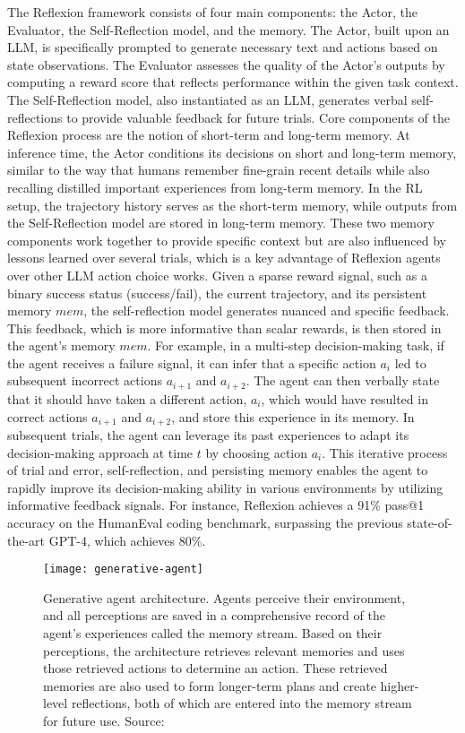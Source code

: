 The Reflexion framework consists of four main components: the Actor, the Evaluator, the Self-Reflection model, and the memory.
The Actor, built upon an LLM, is specifically prompted to generate necessary text and actions based on state observations.
The Evaluator assesses the quality of the Actor's outputs by computing a reward score that reflects performance within the given task context.
The Self-Reflection model, also instantiated as an LLM, generates verbal self-reflections to provide valuable feedback for future trials.
Core components of the Reflexion process are the notion of short-term and long-term memory.
At inference time, the Actor conditions its decisions on short and long-term memory, similar to the way that humans remember fine-grain recent details while also recalling distilled important experiences from long-term memory.
In the RL setup, the trajectory history serves as the short-term memory, while outputs from the Self-Reflection model are stored in long-term memory.
These two memory components work together to provide specific context but are also influenced by lessons learned over several trials, which is a key advantage of Reflexion agents over other LLM action choice works.
Given a sparse reward signal, such as a binary success status (success/fail), the current trajectory, and its persistent memory \(mem\), the self-reflection model generates nuanced and specific feedback.
This feedback, which is more informative than scalar rewards, is then stored in the agent’s memory \(mem\).
For example, in a multi-step decision-making task, if the agent receives a failure signal, it can infer that a specific action \(a_i\) led to subsequent incorrect actions \(a_{i+1}\) and \(a_{i+2}\).
The agent can then verbally state that it should have taken a different action, \(a_i\), which would have resulted in correct actions \(a_{i+1}\) and \(a_{i+2}\), and store this experience in its memory.
In subsequent trials, the agent can leverage its past experiences to adapt its decision-making approach at time \(t\) by choosing action \(a_i\).
This iterative process of trial and error, self-reflection, and persisting memory enables the agent to rapidly improve its decision-making ability in various environments by utilizing informative feedback signals.
For instance, Reflexion achieves a 91\% pass@1 accuracy on the HumanEval coding benchmark, surpassing the previous state-of-the-art GPT-4, which achieves 80\%.

\begin{figure}[h!]
	\centering
	\texttt{[image: generative-agent]}
	\caption{Generative agent architecture. Agents perceive their environment, and all perceptions are saved in a comprehensive record of the agent’s experiences called the memory stream. Based on their perceptions, the architecture retrieves relevant memories and uses those retrieved actions to determine an action. These retrieved memories are also used to form longer-term plans and create higher-level reflections, both of which are entered into the memory stream for future use. Source: \textcite{park2023generativeagentsinteractivesimulacra}}
	\label{fig:generative-agents}
\end{figure}

